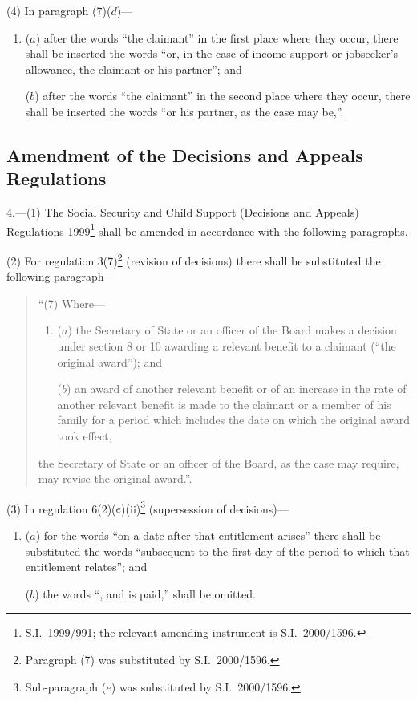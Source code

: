 \documentclass[12pt,a4paper]{article}
\begin{document}
(4) In paragraph (7)($d$)—
\begin{enumerate}\item[]
($a$) after the words “the claimant” in the first place where they occur, there shall be inserted the words “or, in the case of income support or jobseeker’s allowance, the claimant or his partner”; and

($b$) after the words “the claimant” in the second place where they occur, there shall be inserted the words “or his partner, as the case may be,”.
\end{enumerate}

\subsection[4. Amendment of the Decisions and Appeals Regulations]{Amendment of the Decisions and Appeals Regulations}

4.---(1)  The Social Security and Child Support (Decisions and Appeals) Regulations 1999\footnote{S.I.\ 1999/991; the relevant amending instrument is S.I.\ 2000/1596.} shall be amended in accordance with the following paragraphs.

(2) For regulation 3(7)\footnote{Paragraph (7) was substituted by S.I.\ 2000/1596.} (revision of decisions) there shall be substituted the following paragraph—
\begin{quotation}
“(7) Where—
\begin{enumerate}\item[]
($a$) the Secretary of State or an officer of the Board makes a decision under section 8 or 10 awarding a relevant benefit to a claimant (“the original award”); and

($b$) an award of another relevant benefit or of an increase in the rate of another relevant benefit is made to the claimant or a member of his family for a period which includes the date on which the original award took effect,
\end{enumerate}
the Secretary of State or an officer of the Board, as the case may require, may revise the original award.”.
\end{quotation}

(3) In regulation 6(2)($e$)(ii)\footnote{Sub-paragraph ($e$) was substituted by S.I.\ 2000/1596.} (supersession of decisions)—
\begin{enumerate}\item[]
($a$) for the words “on a date after that entitlement arises” there shall be substituted the words “subsequent to the first day of the period to which that entitlement relates”; and

($b$) the words “, and is paid,” shall be omitted.
\end{enumerate}
\end{document}
